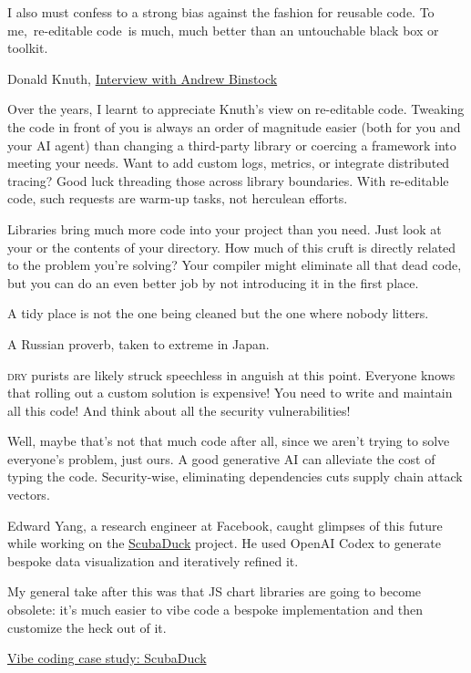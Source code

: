 \documentclass{article}
\begin{document}
\epigraph{
I also must confess to a strong bias against the fashion for reusable code. To me, re-editable code is much, much better than an untouchable black box or toolkit.
}{Donald Knuth, \href{https://www.informit.com/articles/article.aspx?p=1193856}{Interview with Andrew Binstock}}

Over the years, I learnt to appreciate Knuth's view on re-editable code.
Tweaking the code in front of you is always an order of magnitude easier (both for you and your AI agent) than changing a third-party library
or coercing a framework into meeting your needs.
Want to add custom logs, metrics, or integrate distributed tracing?
Good luck threading those across library boundaries.
With re-editable code, such requests are warm-up tasks, not herculean efforts.

Libraries bring much more code into your project than you need.
Just look at your  or the contents of your  directory.
How much of this cruft is directly related to the problem you’re solving?
Your compiler might eliminate all that dead code, but you can do an even better job by not introducing it in the first place.

\epigraph{A tidy place is not the one being cleaned but the one where nobody litters.}{A Russian proverb, taken to extreme in Japan.}

\textsc{dry} purists are likely struck speechless in anguish at this point.
Everyone knows that rolling out a custom solution is expensive!
You need to write and maintain all this code! And think about all the security vulnerabilities!

Well, maybe that's not that much code after all, since we aren't trying to solve everyone's problem, just ours.
A good generative AI can alleviate the cost of typing the code.
Security-wise, eliminating dependencies cuts supply chain attack vectors.

Edward Yang, a research engineer at Facebook, caught glimpses of this future while working on the \href{https://github.com/ezyang/scubaduck}{ScubaDuck} project.
He used OpenAI Codex to generate bespoke data visualization and iteratively refined it.

\epigraph{
  My general take after this was that JS chart libraries are going to become obsolete: it's much easier to vibe code a bespoke implementation and then customize the heck out of it.
}{\href{https://blog.ezyang.com/2025/06/vibe-coding-case-study-scubaduck/}{Vibe coding case study: ScubaDuck}}
\end{document}
